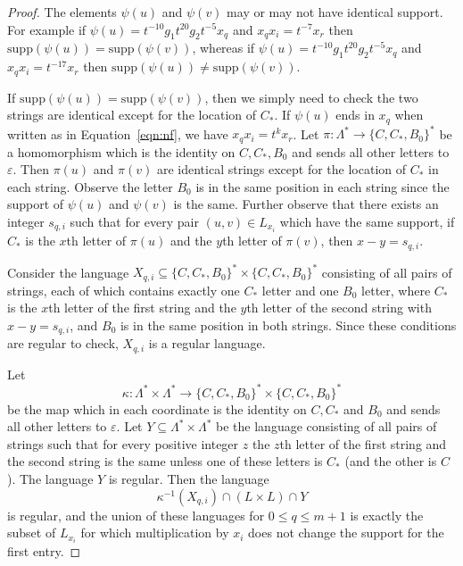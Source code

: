 \documentclass[11pt]{amsart}
\theoremstyle{definition}
\newcommand\support{\mathrm{supp}}
\begin{document}
\begin{proof}
The elements $\psi(u)$ and $\psi(v)$ may or may not have identical support. For example 
if  $\psi(u)=t^{-10}g_1t^{20}g_2t^{-5}x_q$ and $x_qx_i=t^{-7}x_r$ then $\support(\psi(u))=\support(\psi(v))$, 
whereas if  $\psi(u)=t^{-10}g_1t^{20}g_2t^{-5}x_q$ and $x_qx_i=t^{-17}x_r$ then $\support(\psi(u))\neq\support(\psi(v))$.


If $\support(\psi(u)) = \support(\psi(v))$,  then we simply need to check the two strings are identical except for the location of $C_*$.  
If $\psi(u)$ ends in $x_q$ when written as in Equation~\eqref{eqn:nf},  we have  $x_qx_i = t^kx_r$.  
Let $\pi:\Lambda^*\to \{C,C_*,B_0\}^*$ be a homomorphism which is the identity on $C,C_*,B_0$ and sends all other letters to $\varepsilon$. 
Then $\pi(u)$ and $\pi(v)$ are identical strings except for the location of $C_*$ in each string. Observe the letter $B_0$ is in the same position in each string since the support of $\psi(u)$ and $\psi(v)$ is the same.
Further observe that there exists an integer  $s_{q,i}$ such that for every pair $(u,v)\in L_{x_i}$ which have the same support, if $C_*$ is the $x$th letter of $\pi(u)$ and the $y$th letter of $\pi(v)$, then $x-y=s_{q,i}$.



 Consider the language $X_{q,i}\subseteq \{C,C_*,B_0\}^*\times  \{C,C_*,B_0\}^*$
consisting of all pairs of strings, each of which contains exactly one $C_*$ letter and one $B_0$ letter, 
where  $C_*$ is the $x$th letter of the first string and the $y$th letter of the second string with $x-y=s_{q,i}$,
and $B_0$ is in the same position in both strings.  
Since these conditions are regular to check, $X_{q,i}$ is a regular language.



Let \[\kappa: \Lambda^*\times \Lambda^*\to  \{C,C_*,B_0\}^*\times  \{C,C_*,B_0\}^*\] be the map which  in each coordinate is the identity on  $C,C_*$ and $B_0$ and sends all other letters  to $\varepsilon$.  
Let $Y \subseteq \Lambda^* \times \Lambda^*$ be the 
language consisting of all pairs of strings 
such that for every positive integer $z$ the $z$th letter of the first
string and the second string is the same unless one of these 
letters is $C_*$ (and the other is $C$). The language $Y$ is regular.    
Then the language \[\kappa^{-1}(X_{q,i})\cap \left(L\times L\right) \cap Y\] is regular, and the union of these languages for $0\leq q\leq m+1$   is exactly the subset of $L_{x_i}$ for which multiplication by $x_i$ does not change the support for the first entry.




\end{proof}
\end{document}
